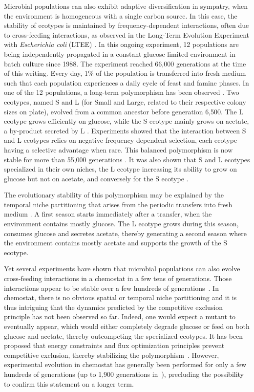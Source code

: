 Microbial populations can also exhibit adaptive diversification in sympatry, when the environment is homogeneous with a single carbon source. In this case, the stability of ecotypes is maintained by frequency-dependent interactions, often due to cross-feeding interactions, as observed in the Long-Term Evolution Experiment with \textit{Escherichia coli} (LTEE) \citep{elena-and-lenski-2003}. In this ongoing experiment, 12 populations are being independently propagated in a constant glucose-limited environment in batch culture since 1988. The experiment reached 66,000 generations at the time of this writing. Every day, 1\% of the population is transferred into fresh medium such that each population experiences a daily cycle of feast and famine phases. In one of the 12 populations, a long-term polymorphism has been observed \citep{rozen-et-al-2000}. Two ecotypes, named S and L (for Small and Large, related to their respective colony sizes on plate), evolved from a common ancestor before generation 6,500. The L ecotype grows efficiently on glucose, while the S ecotype mainly grows on acetate, a by-product secreted by L \citep{grosskopf-et-al-2016}. Experiments showed that the interaction between S and L ecotypes relies on negative frequency-dependent selection, each ecotype having a selective advantage when rare. This balanced polymorphism is now stable for more than 55,000 generations \citep{rozen-et-al-2000}. It was also shown that S and L ecotypes specialized in their own niches, the L ecotype increasing its ability to grow on glucose but not on acetate, and conversely for the S ecotype \citep{grosskopf-et-al-2016}. 

The evolutionary stability of this polymorphism may be explained by the temporal niche partitioning that arises from the periodic transfers into fresh medium \citep{spencer-et-al-2007}. A first season starts immediately after a transfer, when the environment contains mostly glucose. The L ecotype grows during this season, consumes glucose and secretes acetate, thereby generating a second season where the environment contains mostly acetate and supports the growth of the S ecotype.

Yet several experiments have shown that microbial populations can also evolve cross-feeding interactions in a chemostat in a few tens of generations. Those interactions appear to be stable over a few hundreds of generations~\citep{helling-et-al-1987,rosenzweig-et-al-1994,treves-et-al-1998}. In chemostat, there is no obvious spatial or temporal niche partitioning and it is thus intriguing that the dynamics predicted by the competitive exclusion principle has not been observed so far. Indeed, one would expect a mutant to eventually appear, which would either completely degrade glucose or feed on both glucose and acetate, thereby outcompeting the specialized ecotypes. It has been proposed that energy constraints and flux optimization principles prevent competitive exclusion, thereby stabilizing the polymorphism~\citep{pfeiffer-bonhoeffer-2004,gerlee-lundh-2010a}. However, experimental evolution in chemostat has generally been performed for only a few hundreds of generations (up to 1,900 generations in~\cite{helling-et-al-1987}), precluding the possibility to confirm this statement on a longer term.

